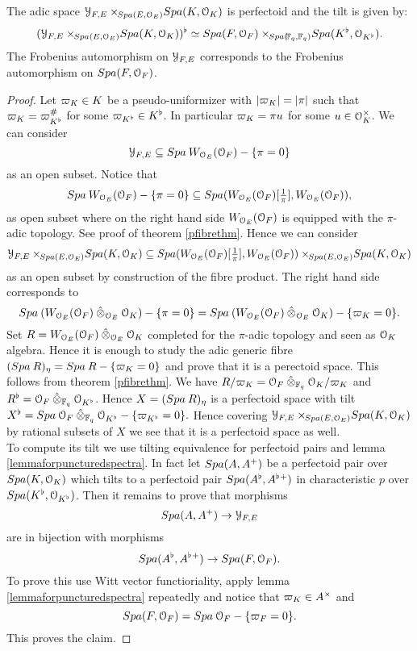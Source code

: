 \begin{prop}\label{tiltcurveprop}
The adic space $\mathcal{Y}_{F,E}\times\!\!_{{Spa({E},{\mathcal{O}_E})}}{Spa({K},{\mathcal{O}_K})}$ is perfectoid and the tilt is given by:
\[(\mathcal{Y}_{F,E}\times\!\!_{{Spa({E},{\mathcal{O}_E})}}{Spa({K},{\mathcal{O}_K})})^{\flat}\simeq {Spa({F},{\mathcal{O}_F})}\times\!\!_{{Spa({\!\mathbb{F}_q},{\mathbb{F}_q})}}{Spa({K^{\flat}},{\mathcal{O}_{K^{\flat}}})}.\]
The Frobenius automorphism on $\mathcal{Y}_{F,E}$ corresponds to the Frobenius automorphism on ${Spa({F},{\mathcal{O}_F})}$.
\end{prop}
\begin{proof}
Let $\varpi_K\in K$ be a pseudo-uniformizer with $\lvert\varpi_K\rvert=\lvert\pi\rvert$ such that $\varpi_K=\varpi_{K^{\flat}}^{\#}$ for some $\varpi_{K^{\flat}}\in K^{\flat}$.
In particular $\varpi_K=\pi u$ for some $u\in\mathcal{O}_{K}^{\times}$.
We can consider 
\[\mathcal{Y}_{F,E} \subseteq {Spa{\:W_{\mathcal{O}_E}(\mathcal{O}_F)}}-\{\pi=0\}\]
as an open subset.
Notice that 
\[{Spa{\:W_{\mathcal{O}_E}(\mathcal{O}_F)}}-\{\pi=0\} \subseteq {Spa({W_{\mathcal{O}_E}(\mathcal{O}_F)[\tfrac{1}{\pi}]},{W_{\mathcal{O}_E}(\mathcal{O}_F)})},\] 
as open subset where on the right hand side $W_{\mathcal{O}_E}(\mathcal{O}_F)$ is equipped with the $\pi$-adic topology. See proof of theorem \ref{pfibrethm}.
Hence we can consider 
\[\mathcal{Y}_{F,E}\times\!\!_{{Spa({E},{\mathcal{O}_E})}}{Spa({K},{\mathcal{O}_K})}\subseteq {Spa({W_{\mathcal{O}_E}(\mathcal{O}_F)[\tfrac{1}{\pi}]},{W_{\mathcal{O}_E}(\mathcal{O}_F)})}\times\!\!_{{Spa({E},{\mathcal{O}_E})}}{Spa({K},{\mathcal{O}_K})}\]
as an open subset by construction of the fibre product. The right hand side corresponds to 
\[{Spa{\:(W_{\mathcal{O}_E}(\mathcal{O}_F)\mathbin{\hat{\otimes}}_{\mathcal{O}_E}\mathcal{O}_K)}}-\{\pi=0\} = {Spa{\:(W_{\mathcal{O}_E}(\mathcal{O}_F)\mathbin{\hat{\otimes}}_{\mathcal{O}_E}\mathcal{O}_K)}}-\{\varpi_K=0\}.\]
Set $R=W_{\mathcal{O}_E}(\mathcal{O}_F)\mathbin{\hat{\otimes}}_{\mathcal{O}_E}\mathcal{O}_K$ completed for the $\pi$-adic topology and seen as $\mathcal{O}_K$ algebra. Hence it is enough to study the adic generic fibre 
\(({Spa{\:R}})_{\eta} = {Spa{\:R}}-\{\varpi_K=0\}\)
and prove that it is a perectoid space.
This follows from theorem \ref{pfibrethm}.
We have $R/\varpi_K = \mathcal{O}_F\mathbin{\hat{\otimes}}_{\mathbb{F}_q}\mathcal{O}_K/\varpi_K$ and
$R^{\flat} =  \mathcal{O}_F\mathbin{\hat{\otimes}}_{\mathbb{F}_q}\mathcal{O}_{K^{\flat}}$.
Hence \(X=({Spa{\:R}})_{\eta}\) is a perfectoid space with tilt \(X^{\flat}={Spa{\:\mathcal{O}_F\mathbin{\hat{\otimes}}_{\mathbb{F}_q}\mathcal{O}_{K^{\flat}}}}-\{\varpi_{K^{\flat}}=0\}.\)
Hence covering $\mathcal{Y}_{F,E}\times\!\!_{{Spa({E},{\mathcal{O}_E})}}{Spa({K},{\mathcal{O}_K})}$ by rational subsets of $X$ we see that it is a perfectoid space as well.\\ 

To compute its tilt we use tilting equivalence for perfectoid pairs and lemma \ref{lemmaforpuncturedspectra}. In fact let ${Spa({A},{A{^{+}}})}$ be a perfectoid pair over ${Spa({K},{\mathcal{O}_K})}$ which tilts to a perfectoid pair ${Spa({A^{\flat}},{A^{\flat}{^{+}}})}$ in characteristic $p$ over ${Spa({K^{\flat}},{\mathcal{O}_{K^{\flat}}})}$. Then it remains to prove that morphisms 
\[{Spa({A},{A{^{+}}})}\to\mathcal{Y}_{F,E}\]
are in bijection with morphisms
\[{Spa({A^{\flat}},{A^{\flat}{^{+}}})}\to {Spa({F},{\mathcal{O}_F})}.\]
To prove this use Witt vector functioriality, apply lemma \ref{lemmaforpuncturedspectra} repeatedly and notice that 
$\varpi_K\in A^{\times}$ and
\[{Spa({F},{\mathcal{O}_F})} = {Spa{\:\mathcal{O}_F}}-\{\varpi_F=0\}.\] 
This proves the claim.



\end{proof}
